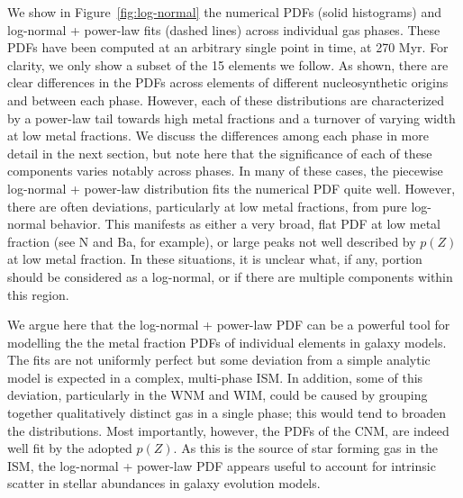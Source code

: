 \documentclass[twocolumn]{aastex61}
\begin{document}
We show in Figure~\ref{fig:log-normal} the numerical PDFs (solid histograms) and log-normal + power-law fits (dashed lines) across individual gas phases. These PDFs have been computed at an arbitrary single point in time, at 270 Myr. For clarity, we only show a subset of the 15 elements we follow. As shown, there are clear differences in the PDFs across elements of different nucleosynthetic origins and between each phase. However, each of these distributions are characterized by a power-law tail towards high metal fractions and a turnover of varying width at low metal fractions. We discuss the differences among each phase in more detail in the next section, but note here that the significance of each of these components varies notably across phases. In many of these cases, the piecewise log-normal + power-law distribution fits the numerical PDF quite well. However, there are often deviations, particularly at low metal fractions, from pure log-normal behavior. This manifests as either a very broad, flat PDF at low metal fraction (see N and Ba, for example), or large peaks not well described by $p(Z)$ at low metal fraction. In these situations, it is unclear what, if any, portion should be considered as a log-normal, or if there are multiple components within this region.

We argue here that the log-normal + power-law PDF can be a powerful tool for modelling the the metal fraction  PDFs of individual elements in galaxy models. The fits are not uniformly perfect but some deviation from a simple analytic model is expected in a complex, multi-phase ISM. In addition, some of this deviation, particularly in the WNM and WIM, could be caused by grouping together qualitatively distinct gas in a single phase; this would tend to broaden the distributions. Most importantly, however, the PDFs of the CNM, are indeed well fit by the adopted $p(Z)$. As this is the source of star forming gas in the ISM, the log-normal + power-law PDF appears useful to account for intrinsic scatter in stellar abundances in galaxy evolution models.
\end{document}
